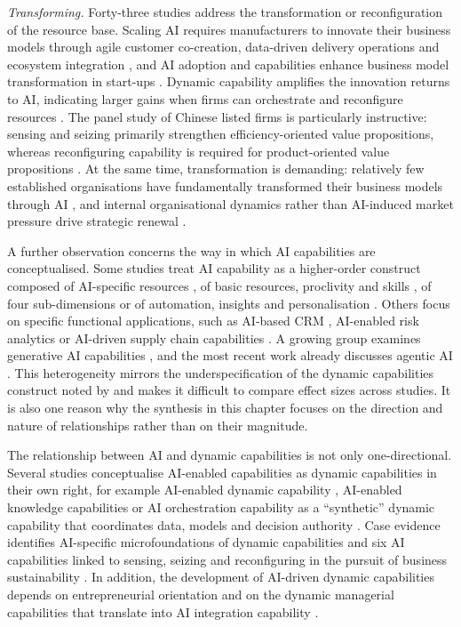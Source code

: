 \emph{Transforming.} Forty-three studies address the transformation or reconfiguration of the resource base. Scaling AI requires manufacturers to innovate their business models through agile customer co-creation, data-driven delivery operations and ecosystem integration \parencite[574]{sjodin2021}, and AI adoption and capabilities enhance business model transformation in start-ups \parencite[1]{slrR037}. Dynamic capability amplifies the innovation returns to AI, indicating larger gains when firms can orchestrate and reconfigure resources \parencite[1]{slrR010}. The panel study of Chinese listed firms is particularly instructive: sensing and seizing primarily strengthen efficiency-oriented value propositions, whereas reconfiguring capability is required for product-oriented value propositions \parencite[1]{huang2026}. At the same time, transformation is demanding: relatively few established organisations have fundamentally transformed their business models through AI \parencite[1]{black2024}, and internal organisational dynamics rather than AI-induced market pressure drive strategic renewal \parencite[1242]{slrR085}.

A further observation concerns the way in which AI capabilities are conceptualised. Some studies treat AI capability as a higher-order construct composed of AI-specific resources \parencite[1]{mikalef2021capability}, of basic resources, proclivity and skills \parencite[1]{chen2022}, of four sub-dimensions \parencite[1]{slrR017} or of automation, insights and personalisation \parencite[1]{slrR120}. Others focus on specific functional applications, such as AI-based CRM \parencites[205]{chatterjee2021}[1]{alnofeli2026}, AI-enabled risk analytics \parencites[1]{slrR122}[1]{slrR093} or AI-driven supply chain capabilities \parencites[1]{slrR041}[1]{slrR108}. A growing group examines generative AI capabilities \parencites[10]{li2025}[7274]{slrR032}[1]{slrR091}[1]{slrR110}[93]{slrR219}, and the most recent work already discusses agentic AI \parencite[1]{slrR086}. This heterogeneity mirrors the underspecification of the dynamic capabilities construct noted by \textcite[390]{schilke2018} and makes it difficult to compare effect sizes across studies. It is also one reason why the synthesis in this chapter focuses on the direction and nature of relationships rather than on their magnitude.

The relationship between AI and dynamic capabilities is not only one-directional. Several studies conceptualise AI-enabled capabilities as dynamic capabilities in their own right, for example AI-enabled dynamic capability \parencite[1]{slrR079}, AI-enabled knowledge capabilities \parencite[84]{dinh2026} or AI orchestration capability as a \enquote{synthetic} dynamic capability that coordinates data, models and decision authority \parencite[1]{slrR008}. Case evidence identifies AI-specific microfoundations of dynamic capabilities \parencite[80]{mikalef2021b2b} and six AI capabilities linked to sensing, seizing and reconfiguring in the pursuit of business sustainability \parencite[109]{slrR064}. In addition, the development of AI-driven dynamic capabilities depends on entrepreneurial orientation \parencite[1]{slrR068} and on the dynamic managerial capabilities that translate into AI integration capability \parencite[1]{slrR031}.

